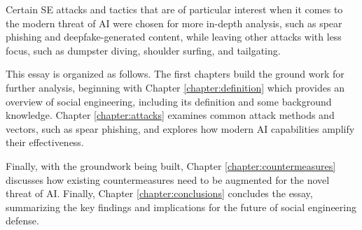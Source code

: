 Certain SE attacks and tactics that are of particular interest when it comes to the modern threat of AI were chosen for more in-depth analysis, such as spear phishing and deepfake-generated content, while leaving other attacks with less focus, such as dumpster diving, shoulder surfing, and tailgating.




This essay is organized as follows. The first chapters build the ground work for further analysis, beginning with Chapter \ref{chapter:definition} which provides an overview of social engineering, including its definition and some background knowledge. Chapter \ref{chapter:attacks} examines common attack methods and vectors, such as spear phishing, and explores how modern AI capabilities amplify their effectiveness.




Finally, with the groundwork being built, Chapter \ref{chapter:countermeasures} discusses how existing countermeasures need to be augmented for the novel threat of AI. Finally, Chapter \ref{chapter:conclusions} concludes the essay, summarizing the key findings and implications for the future of social engineering defense.



